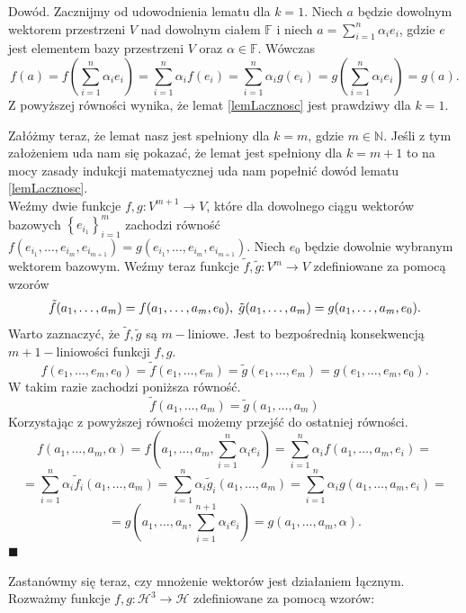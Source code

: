 \documentclass[a4paper,twoside,11pt,reqno]{mwrep}
\theoremstyle{plain} \newtheorem{twr}{Twierdzenie}
\theoremstyle{plain} \newtheorem{lem}{Lemat}
\theoremstyle{definition} \newtheorem{defi}{Definicja}
\theoremstyle{remark} \newtheorem*{wni}{Wniosek}
\theoremstyle{definition} \newtheorem{uwaga}{Uwaga}
\theoremstyle{definition}\newtheorem{prz}{Przykład}
\newenvironment{dowod}{\par\vspace{0.1cm}\par{\sc Dowód.}}{\hfill $\blacksquare$\par\vspace{0.4cm}\par}
\begin{document}
\begin{dowod}
Zacznijmy od udowodnienia lematu dla $k=1$. Niech $a$ będzie dowolnym wektorem przestrzeni
$V$ nad dowolnym ciałem $\mathbb{F}$ i niech $a=\sum\limits_{i=1}^{n}\alpha_i e_i$, gdzie $e$ jest elementem bazy
przestrzeni $V$ oraz $\alpha\in\mathbb{F}$. Wówczas 
$$f(a)=f\left(\sum\limits_{i=1}^{n}\alpha_i e_i\right)=\sum\limits_{i=1}^{n}\alpha_i f(e_i)=\sum\limits_{i=1}^{n}\alpha_i g(e_i)=g\left(\sum\limits_{i=1}^{n}\alpha_i e_i\right)=g(a).$$
Z powyższej równości wynika, że lemat \ref{lemLacznosc} jest prawdziwy dla $k=1$.

Załóżmy teraz, że lemat nasz jest spełniony dla $k=m$, gdzie $m\in\mathbb{N}$. Jeśli z tym
założeniem uda nam się pokazać, że lemat jest spełniony dla $k=m+1$ to na mocy zasady indukcji
matematycznej uda nam popełnić dowód lematu \ref{lemLacznosc}.\\

Weźmy dwie funkcje $f,g:V^{m+1} 	\rightarrow V$, które dla dowolnego ciągu wektorów bazowych 
$\left\{ e_{i_1}\right\}_{i=1}^m$ zachodzi równość
$f(e_{i_1},\dots,e_{i_m},e_{i_{m+1}})=g(e_{i_1},\dots,e_{i_m},e_{i_{m+1}})$.
Niech $e_0$ będzie dowolnie wybranym wektorem bazowym. Weźmy teraz funkcje  
$\tilde{f},\tilde{g}: V^m\rightarrow V$ zdefiniowane za pomocą wzorów
$$\tilde{f}(a_1,\dots,a_m)= f(a_1,\dots,a_m,e_0),\hspace{1mm}\tilde{g}(a_1,\dots,a_m)=
 g(a_1,\dots,a_m,e_0). $$
 Warto zaznaczyć, że $\tilde{f},\tilde{g}$ są $m-$liniowe. Jest to bezpośrednią konsekwencją
 $m+1-$liniowości funkcji $f,g$. 
 $$f(e_1,\dots,e_m,e_0) = \tilde{f}(e_1,\dots,e_m) = \tilde{g}(e_1,\dots,e_m) 
 =g(e_1,\dots,e_m,e_0). $$
W takim razie zachodzi poniższa równość.
 $$\tilde{f}(a_1,\dots,a_m)=\tilde{g}\left(a_1,\dots,a_m\right)$$
 Korzystając z powyższej równości możemy przejść do ostatniej równości.
  $$f(a_1,\dots,a_m,\alpha) = 
  f\left(a_1,\dots,a_m,\sum\limits_{i=1}^{n}\alpha_i e_i\right)=
  \sum\limits_{i=1}^{n}\alpha_i f\left(a_1,\dots,a_m, e_i\right)= $$
  $$=\sum\limits_{i=1}^{n}\alpha_i \tilde{f}_i\left(a_1,\dots,a_m\right)=
  \sum\limits_{i=1}^{n}\alpha_i \tilde{g}_i\left(a_1,\dots,a_m\right)= 
     \sum\limits_{i=1}^{n}\alpha_i g\left(a_1,\dots,a_m, e_i\right)= $$
     $$=g\left(a_1,\dots,a_n,\sum\limits_{i=1}^{n+1}\alpha_i e_i\right)=g(a_1,\dots,a_m,\alpha).$$
\end{dowod}
Zastanówmy się teraz, czy mnożenie wektorów jest działaniem łącznym.
Rozważmy funkcje $f,g:\mathcal{H}^3\rightarrow\mathcal{H}$ zdefiniowane za pomocą wzorów:
\end{document}

